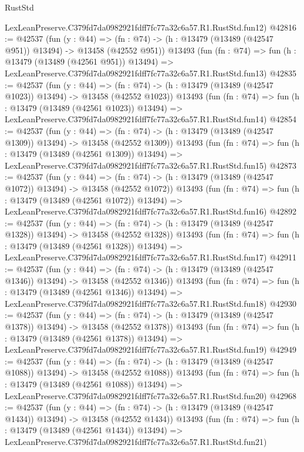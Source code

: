 \begin{lexlean}{RustStd}
\begin{coremodule}
    LexLeanPreserve.C379fd7da0982921fdff7fc77a32c6a57.R1.RustStd.fun12)
@42816 := @42537
    (fun (y : @44) =>
    (fn : @74) -> (h : @13479 (@13489 (@42547 @951)) @13494) -> @13458 (@42552 @951))
    @13493
    (fun (fn : @74) =>
    fun (h : @13479 (@13489 (@42561 @951)) @13494) =>
    LexLeanPreserve.C379fd7da0982921fdff7fc77a32c6a57.R1.RustStd.fun13)
@42835 := @42537
    (fun (y : @44) =>
    (fn : @74) -> (h : @13479 (@13489 (@42547 @1023)) @13494) -> @13458 (@42552 @1023))
    @13493
    (fun (fn : @74) =>
    fun (h : @13479 (@13489 (@42561 @1023)) @13494) =>
    LexLeanPreserve.C379fd7da0982921fdff7fc77a32c6a57.R1.RustStd.fun14)
@42854 := @42537
    (fun (y : @44) =>
    (fn : @74) -> (h : @13479 (@13489 (@42547 @1309)) @13494) -> @13458 (@42552 @1309))
    @13493
    (fun (fn : @74) =>
    fun (h : @13479 (@13489 (@42561 @1309)) @13494) =>
    LexLeanPreserve.C379fd7da0982921fdff7fc77a32c6a57.R1.RustStd.fun15)
@42873 := @42537
    (fun (y : @44) =>
    (fn : @74) -> (h : @13479 (@13489 (@42547 @1072)) @13494) -> @13458 (@42552 @1072))
    @13493
    (fun (fn : @74) =>
    fun (h : @13479 (@13489 (@42561 @1072)) @13494) =>
    LexLeanPreserve.C379fd7da0982921fdff7fc77a32c6a57.R1.RustStd.fun16)
@42892 := @42537
    (fun (y : @44) =>
    (fn : @74) -> (h : @13479 (@13489 (@42547 @1328)) @13494) -> @13458 (@42552 @1328))
    @13493
    (fun (fn : @74) =>
    fun (h : @13479 (@13489 (@42561 @1328)) @13494) =>
    LexLeanPreserve.C379fd7da0982921fdff7fc77a32c6a57.R1.RustStd.fun17)
@42911 := @42537
    (fun (y : @44) =>
    (fn : @74) -> (h : @13479 (@13489 (@42547 @1346)) @13494) -> @13458 (@42552 @1346))
    @13493
    (fun (fn : @74) =>
    fun (h : @13479 (@13489 (@42561 @1346)) @13494) =>
    LexLeanPreserve.C379fd7da0982921fdff7fc77a32c6a57.R1.RustStd.fun18)
@42930 := @42537
    (fun (y : @44) =>
    (fn : @74) -> (h : @13479 (@13489 (@42547 @1378)) @13494) -> @13458 (@42552 @1378))
    @13493
    (fun (fn : @74) =>
    fun (h : @13479 (@13489 (@42561 @1378)) @13494) =>
    LexLeanPreserve.C379fd7da0982921fdff7fc77a32c6a57.R1.RustStd.fun19)
@42949 := @42537
    (fun (y : @44) =>
    (fn : @74) -> (h : @13479 (@13489 (@42547 @1088)) @13494) -> @13458 (@42552 @1088))
    @13493
    (fun (fn : @74) =>
    fun (h : @13479 (@13489 (@42561 @1088)) @13494) =>
    LexLeanPreserve.C379fd7da0982921fdff7fc77a32c6a57.R1.RustStd.fun20)
@42968 := @42537
    (fun (y : @44) =>
    (fn : @74) -> (h : @13479 (@13489 (@42547 @1434)) @13494) -> @13458 (@42552 @1434))
    @13493
    (fun (fn : @74) =>
    fun (h : @13479 (@13489 (@42561 @1434)) @13494) =>
    LexLeanPreserve.C379fd7da0982921fdff7fc77a32c6a57.R1.RustStd.fun21)

\end{coremodule}
\end{lexlean}
